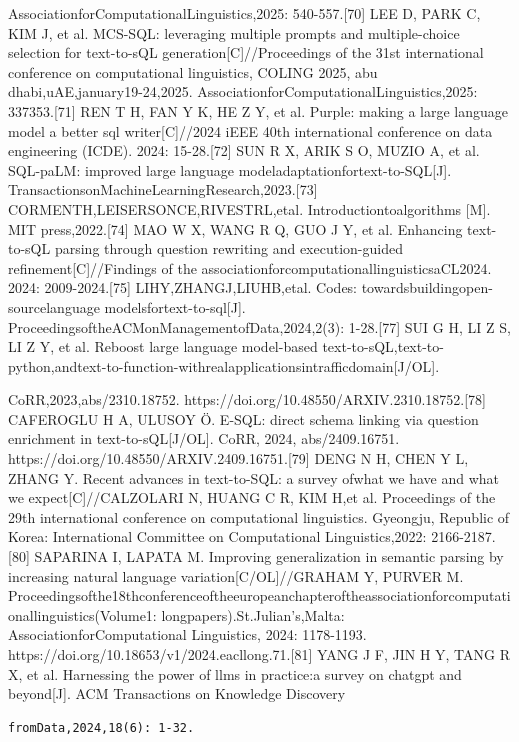 \documentclass[12pt,a4paper,openright,UTF8]{ctexbook}
\begin{document}
AssociationforComputationalLinguistics,2025: 540-557.[70] LEE D, PARK C, KIM J, et al. MCS-SQL: leveraging multiple prompts and multiple-choice selection for text-to-sQL generation[C]//Proceedings of the 31st international conference on computational linguistics, COLING 2025, abu dhabi,uAE,january19-24,2025. AssociationforComputationalLinguistics,2025: 337353.[71] REN T H, FAN Y K, HE Z Y, et al. Purple: making a large language model a better sql writer[C]//2024 iEEE 40th international conference on data engineering (ICDE). 2024: 15-28.[72] SUN R X, ARIK S O, MUZIO A, et al. SQL-paLM: improved large language modeladaptationfortext-to-SQL[J]. TransactionsonMachineLearningResearch,2023.[73] CORMENTH,LEISERSONCE,RIVESTRL,etal. Introductiontoalgorithms [M]. MIT press,2022.[74] MAO W X, WANG R Q, GUO J Y, et al. Enhancing text-to-sQL parsing through question rewriting and execution-guided refinement[C]//Findings of the associationforcomputationallinguisticsaCL2024. 2024: 2009-2024.[75] LIHY,ZHANGJ,LIUHB,etal. Codes: towardsbuildingopen-sourcelanguage modelsfortext-to-sql[J]. ProceedingsoftheACMonManagementofData,2024,2(3): 1-28.[77] SUI G H, LI Z S, LI Z Y, et al. Reboost large language model-based text-to-sQL,text-to-python,andtext-to-function-withrealapplicationsintrafficdomain[J/OL].


CoRR,2023,abs/2310.18752. https://doi.org/10.48550/ARXIV.2310.18752.[78] CAFEROGLU H A, ULUSOY Ö. E-SQL: direct schema linking via question enrichment in text-to-sQL[J/OL]. CoRR, 2024, abs/2409.16751. https://doi.org/10.48550/ARXIV.2409.16751.[79] DENG N H, CHEN Y L, ZHANG Y. Recent advances in text-to-SQL: a survey ofwhat we have and what we expect[C]//CALZOLARI N, HUANG C R, KIM H,et al. Proceedings of the 29th international conference on computational linguistics. Gyeongju, Republic of Korea: International Committee on Computational Linguistics,2022: 2166-2187.[80] SAPARINA I, LAPATA M. Improving generalization in semantic parsing by increasing natural language variation[C/OL]//GRAHAM Y, PURVER M. Proceedingsofthe18thconferenceoftheeuropeanchapteroftheassociationforcomputationallinguistics(Volume1: longpapers).St.Julian’s,Malta: AssociationforComputational Linguistics, 2024: 1178-1193. https://doi.org/10.18653/v1/2024.eacllong.71.[81] YANG J F, JIN H Y, TANG R X, et al. Harnessing the power of llms in practice:a survey on chatgpt and beyond[J]. ACM Transactions on Knowledge Discovery

\begin{lstlisting}
fromData,2024,18(6): 1-32.
\end{lstlisting}
\end{document}
